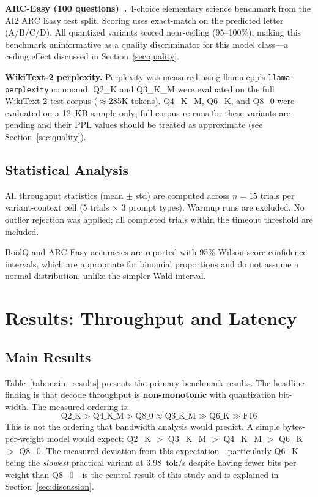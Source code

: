 \documentclass[conference]{IEEEtran}
\begin{document}
\textbf{ARC-Easy (100 questions)~\cite{arc}.}
4-choice elementary science benchmark from the AI2 ARC Easy test split.
Scoring uses exact-match on the predicted letter (A/B/C/D). All quantized
variants scored near-ceiling (95--100\%), making this benchmark uninformative
as a quality discriminator for this model class---a ceiling effect discussed
in Section~\ref{sec:quality}.

\textbf{WikiText-2 perplexity.}
Perplexity was measured using llama.cpp's \texttt{llama-perplexity} command.
Q2\_K and Q3\_K\_M were evaluated on the full WikiText-2 test corpus
(${\approx}$285K tokens). Q4\_K\_M, Q6\_K, and Q8\_0 were evaluated on a
12~KB sample only; full-corpus re-runs for these variants are pending and
their PPL values should be treated as approximate (see Section~\ref{sec:quality}).

\subsection{Statistical Analysis}

All throughput statistics (mean $\pm$ std) are computed across $n{=}15$
trials per variant-context cell (5 trials $\times$ 3 prompt types). Warmup
runs are excluded. No outlier rejection was applied; all completed trials within
the timeout threshold are included.

BoolQ and ARC-Easy accuracies are reported with 95\% Wilson score confidence
intervals, which are appropriate for binomial proportions and do not assume
a normal distribution, unlike the simpler Wald interval.

\section{Results: Throughput and Latency}
\label{sec:rq1}

\subsection{Main Results}

Table~\ref{tab:main_results} presents the primary benchmark results.
The headline finding is that decode throughput is \textbf{non-monotonic}
with quantization bit-width. The measured ordering is:
\[
  \text{Q2\_K} > \text{Q4\_K\_M} > \text{Q8\_0} \approx \text{Q3\_K\_M} \gg \text{Q6\_K} \gg \text{F16}
\]
This is not the ordering that bandwidth analysis would predict. A simple
bytes-per-weight model would expect:
Q2\_K $>$ Q3\_K\_M $>$ Q4\_K\_M $>$ Q6\_K $>$ Q8\_0.
The measured deviation from this expectation---particularly Q6\_K being the
\emph{slowest} practical variant at 3.98~tok/s despite having fewer bits
per weight than Q8\_0---is the central result of this study and is explained
in Section~\ref{sec:discussion}.
\end{document}
